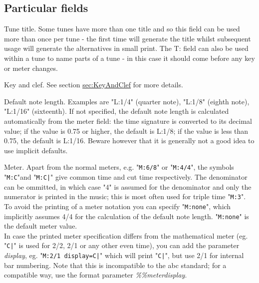 \documentclass[a4paper]{article}
\begin{document}
\subsection{Particular fields}
\begin{description}

\item[T:] Tune title. 
Some tunes have more than one title and  so  this
field  can  be used more than once per tune - the first time will
generate the title whilst  subsequent  usage  will  generate  the
alternatives  in  small  print.   The  T:  field can also be used
within a tune to name parts of a tune - in this  case  it  should
come before any key or meter changes.

\item[K:] Key and clef. See section 
\hyperref{key and clef}{}{}{sec:KeyAndClef} for
more details.

\item[L:] Default note length. 
Examples are "L:1/4" (quarter note),  
"L:1/8" (eighth note), "L:1/16" (sixteenth). If not specified, the
default note length is calculated automatically from the meter  field:
the time signature is converted to its decimal value; if the value is 
0.75 or higher, the default is L:1/8; if the value is less than 0.75, 
the default is L:1/16. Beware however that it is generally not a good idea
to use implicit defaults.

\item[M:] Meter. 
Apart from the normal meters, e.g. "\verb$M:6/8$" or 
"\verb$M:4/4$", the symbols "\verb$M:C$"and "\verb$M:C|$"
give common time and cut time respectively. The denominator
can be ommitted, in which case "4" is assumed for the denominator
and only the numerator is printed in the music; this is most often
used for triple time "\verb$M:3$".\\
To avoid the printing of a meter notation you can specify 
"\verb$M:none$", which implicitly assumes 4/4 for the calculation of 
the default note length. "\verb$M:none$" is the default meter value.\\
In case the printed meter specification differs from the mathematical
meter (eg. "\verb$C|$" is used for 2/2, 2/1 or any other even time),
you can add the parameter {\it display}, eg. "\verb$M:2/1 display=C|$"
which will print "\verb$C|$", but use 2/1 for internal bar numbering.
Note that this is incompatible to the abc standard; for a compatible
way, use the format parameter {\it \%\%meterdisplay}.


\end{description}
\end{document}
